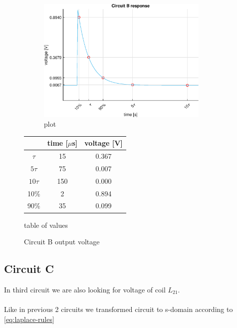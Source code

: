 \documentclass[notitlepage, a4paper, 11pt]{article}
\begin{document}
	\begin{figure}[H]
	\centering
	\begin{subfigure}{0.6\textwidth}
		\includegraphics[width=0.9\textwidth]{../Matlab/img/CircuitB.eps}
		\caption{plot}
	\end{subfigure}
	\hfill
	\begin{subtable}{0.38\textwidth}
		\centering
		\begin{tabular}{|c|c|c|}
			\hline
			 & time [$\mu$s] & voltage [V] \\
			\hline
			$\tau$ & 15 & 0.367 \\
			\hline		
			$5\tau$ & 75 & 0.007 \\
			\hline
			$10\tau$ & 150 & 0.000 \\
			\hline
			10\% & 2 & 0.894 \\
			\hline
			90\% & 35 & 0.099 \\
			\hline
		\end{tabular}
		\caption{table of values}
	\end{subtable}
	\caption{Circuit B output voltage}
\end{figure}
	
	\subsection{Circuit C}
	
	In third circuit we are also looking for voltage of coil $L_{21}$.
	\\ \\
	Like in previous 2 circuits we transformed circuit to s-domain according to \eqref{eq:laplace-rules}
	
\end{document}
